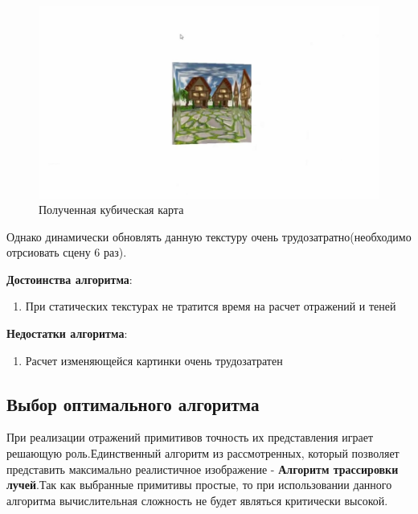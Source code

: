 \documentclass[a4paper,14pt, unknownkeysallowed]{extreport}
\begin{document}
\begin{figure}[h]
	\centering
	\includegraphics[scale=0.4]{cube_maps_real_example}
	\caption{Полученная кубическая карта}
	\label{fig:cube_maps_real_example}
\end{figure}


Однако динамически обновлять данную текстуру очень трудозатратно(необходимо отрсиовать сцену 6 раз).

\textbf{Достоинства алгоритма}:
\begin{enumerate}
	\item При статических текстурах не тратится время на расчет отражений и теней
\end{enumerate}

\textbf{Недостатки алгоритма}:
\begin{enumerate}
	\item Расчет изменяющейся картинки очень трудозатратен
\end{enumerate}

\subsection{Выбор оптимального алгоритма}
При реализации отражений примитивов точность их представления играет решающую роль.Единственный алгоритм из рассмотренных, который позволяет представить максимально
реалистичное изображение - \textbf{Алгоритм трассировки лучей}.Так как выбранные примитивы простые, то при использовании данного алгоритма вычислительная
сложность не будет являться критически высокой.
\end{document}
